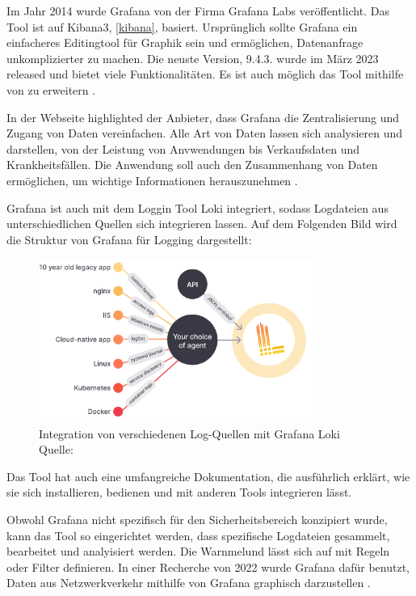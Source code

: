 Im Jahr 2014 wurde Grafana von der Firma Grafana Labs veröffentlicht. Das Tool ist auf Kibana3, \ref{kibana}, basiert. Ursprünglich sollte Grafana ein einfacheres Editingtool für Graphik sein und ermöglichen, Datenanfrage unkomplizierter zu machen. Die neuste Version, 9.4.3. wurde im März 2023 released und bietet viele Funktionalitäten. Es ist auch möglich das Tool mithilfe von  zu erweitern \citep{Oedegaard_historyGrafana}. 

In der Webseite highlighted der Anbieter, dass Grafana die Zentralisierung und Zugang von Daten vereinfachen. Alle Art von Daten lassen sich analysieren und darstellen, von der Leistung von Anvwendungen bis Verkaufsdaten und Krankheitsfällen. Die Anwendung soll auch den Zusammenhang von Daten ermöglichen, um wichtige Informationen herauszunehmen \citep{Grafana_Grafana}.

Grafana ist auch mit dem Loggin Tool Loki integriert, sodass Logdateien aus unterschiedlichen Quellen sich integrieren lassen. Auf dem Folgenden Bild wird die Struktur von Grafana für Logging dargestellt:

\begin{figure}[H]
   \centering
   \includegraphics[width=0.8\textwidth]{assets/2_p10.png}
   \caption{Integration von verschiedenen Log-Quellen mit Grafana Loki \\Quelle: \citep{Grafana_Logs}}
   \centering
\end{figure}

Das Tool hat auch eine umfangreiche Dokumentation, die ausführlich erklärt, wie sie sich installieren, bedienen und mit anderen Tools integrieren lässt.  

\newpage
Obwohl Grafana nicht spezifisch für den Sicherheitsbereich konzipiert wurde, kann das Tool so eingerichtet werden, dass spezifische Logdateien gesammelt, bearbeitet und analyisiert werden. Die Warnmelund lässt sich auf mit Regeln oder Filter definieren. In einer Recherche von 2022 wurde Grafana dafür benutzt, Daten aus Netzwerkverkehr mithilfe von Grafana graphisch darzustellen \citep{Manases_grafananetwork}. 

